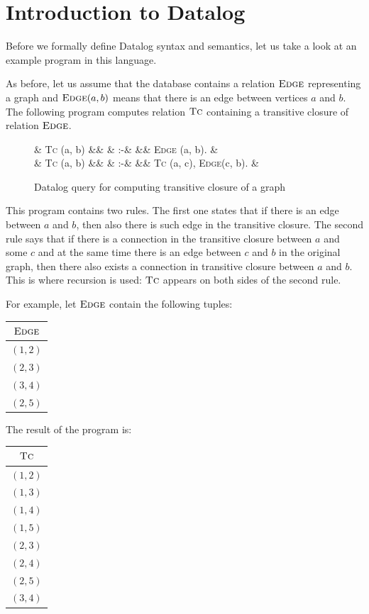 \documentclass{pracamgr}
\theoremstyle{plain}
\theoremstyle{definition}
\theoremstyle{remark}
\newcommand{\assign}{:-}
\newenvironment{centab}[1]{\begin{center}\begin{tabular}{#1}}{\end{tabular}\end{center}}
\newcommand{\narrow}[1]{\begin{changemargin}{2cm}{2cm} #1 \end{changemargin}}
\newcommand{\dprog}[4]{
  \begin{figure}[h!]
    \narrow{
      #1
      \begin{flalign*}
      #2
      \end{flalign*}
      \caption{#3}
      \label{#4}
    }
\end{figure}

}
\begin{document}
\section{Introduction to Datalog}

Before we formally define Datalog syntax and semantics, let us take a look at an example program in this language.

As before, let us assume that the database contains a relation $\textsc{Edge}$ representing a graph and $\textsc{Edge}(a, b)$ means that there is an edge between vertices $a$ and $b$. The following program computes relation $\textsc{Tc}$ containing a transitive closure of relation $\textsc{Edge}$.

\dprog{}{
  & \textsc{Tc} (a, b) &&  & \assign & && \textsc{Edge} (a, b). & \\
  & \textsc{Tc} (a, b) &&  & \assign & && \textsc{Tc} (a, c), \textsc{Edge}(c, b). &\\
}{Datalog query for computing transitive closure of a graph}{ex:tcdatalog}

This program contains two rules. The first one states that if there is an edge between $a$ and $b$, then also there is such edge in the transitive closure. The second rule says that if there is a connection in the transitive closure between $a$ and some $c$ and at the same time there is an edge between $c$ and $b$ in the original graph, then there also exists a connection in transitive closure between $a$ and $b$. This is where recursion is used: $\textsc{Tc}$ appears on both sides of the second rule.

For example, let $\textsc{Edge}$ contain the following tuples:

\begin{centab}{ | c | }
  \hline
  $\textsc{Edge}$ \\
  \hline
  $(1, 2)$ \\
  $(2, 3)$ \\
  $(3, 4)$ \\
  $(2, 5)$ \\
  \hline
\end{centab}

The result of the program is:

\begin{centab}{ | c | }
  \hline
  $\textsc{Tc}$ \\
  \hline
  $(1, 2)$ \\
  $(1, 3)$ \\
  $(1, 4)$ \\
  $(1, 5)$ \\
  $(2, 3)$ \\
  $(2, 4)$ \\
  $(2, 5)$ \\
  $(3, 4)$ \\
  \hline
\end{centab}
\end{document}
